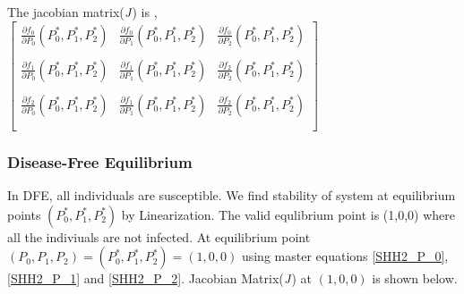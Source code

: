 \documentclass[paper=a4, fontsize=11pt, twoside, BCOR=12mm, parskip=full, listof=totoc]{scrreprt}
\begin{document}
The jacobian matrix($\emph{J}$) is ,\\ 
$\begin{bmatrix}
\label{Model and method jacobian}
\frac{\partial f_0}{\partial P_0}(P_{0}^*,P_{1}^*,P_{2}^*) & \frac{\partial f_0}{\partial P_1}(P_{0}^*,P_{1}^*,P_{2}^*) & \frac{\partial f_0}{\partial P_2}(P_{0}^*,P_{1}^*,P_{2}^*) \\
\\
\frac{\partial f_1}{\partial P_0}(P_{0}^*,P_{1}^*,P_{2}^*) & \frac{\partial f_1}{\partial P_1}(P_{0}^*,P_{1}^*,P_{2}^*) & \frac{\partial f_2}{\partial P_2}(P_{0}^*,P_{1}^*,P_{2}^*) \\
\\
\frac{\partial f_2}{\partial P_0}(P_{0}^*,P_{1}^*,P_{2}^*) & \frac{\partial f_1}{\partial P_1}(P_{0}^*,P_{1}^*,P_{2}^*) & \frac{\partial f_2}{\partial P_2}(P_{0}^*,P_{1}^*,P_{2}^*) \\
\\
\end{bmatrix}$

\subsubsection*{Disease-Free Equilibrium}
In DFE, all individuals are susceptible. We find stability of system at equilibrium points $(P_0^*,P_1^*,P_2^*)$ by Linearization. The valid equlibrium point is (1,0,0) where all the indiviuals are not infected.  At equilibrium point $(P_0,P_1,P_2) = (P_0^*,P_1^*,P_2^*) = (1,0,0)$ using master equations \ref{SHH2_P_0}, \ref{SHH2_P_1} and \ref{SHH2_P_2}. Jacobian Matrix($\emph{J}$) at $(1, 0, 0)$ is shown below.
\end{document}
